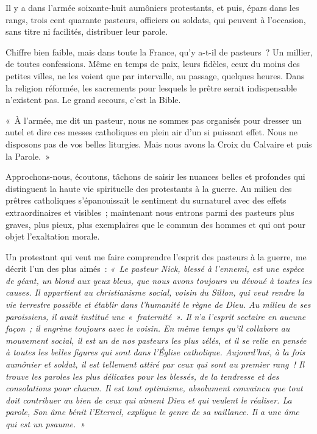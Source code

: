 \documentclass[french,twoside]{book} %
\newcommand\chaptercont{} %
\begin{document}
\chaptercont
\noindent Il y a dans l’armée soixante-huit aumôniers protestants, et puis, épars dans les rangs, trois cent quarante pasteurs, officiers ou soldats, qui peuvent à l’occasion, sans titre ni facilités, distribuer leur parole.‌\par
Chiffre bien faible, mais dans toute la France, qu’y a-t-il de pasteurs ? Un millier, de toutes confessions. Même en temps de paix, leurs fidèles, ceux du moins des petites villes, ne les voient que par intervalle, au passage, quelques heures. Dans la religion réformée, les sacrements pour lesquels le prêtre serait indispensable n’existent pas. Le grand secours, c’est la Bible.‌\par
« À l’armée, me dit un pasteur, nous ne sommes pas organisés pour dresser un autel et dire ces messes catholiques en plein air d’un si puissant effet. Nous ne disposons pas de vos belles liturgies. Mais nous avons la Croix du Calvaire et puis la Parole. »‌\par
Approchons-nous, écoutons, tâchons de saisir les nuances belles et profondes qui distinguent la haute vie spirituelle des protestants à la guerre. Au milieu des prêtres catholiques s’épanouissait le sentiment du surnaturel avec des effets extraordinaires et visibles ; maintenant nous entrons parmi des pasteurs plus graves, plus pieux, plus exemplaires que le commun des hommes et qui ont pour objet l’exaltation morale.‌\par
Un protestant qui veut me faire comprendre l’esprit des pasteurs à la guerre, me décrit l’un des plus aimés : \emph{« Le pasteur Nick, blessé à l’ennemi, est une espèce de géant, un blond aux yeux bleus, que nous avons toujours vu dévoué à toutes les causes. Il appartient au christianisme social, voisin du {\itshape Sillon}, qui veut rendre la vie terrestre possible et établir dans l’humanité le règne de Dieu. Au milieu de ses paroissiens, il avait institué une « fraternité ». Il n’a l’esprit sectaire en aucune façon ; il engrène toujours avec le voisin. En même temps qu’il collabore au mouvement social, il est un de nos pasteurs les plus zélés, et il se relie en pensée à toutes les belles figures qui sont dans l’Église catholique. Aujourd’hui, à la fois aumônier et soldat, il est tellement attiré par ceux qui sont au premier rang ! Il trouve les paroles les plus délicates pour les blessés, de la tendresse et des consolations pour chacun. Il est tout optimisme, absolument convaincu que tout doit contribuer au bien de ceux qui aiment Dieu et qui veulent le réaliser. La parole, {\itshape Son âme bénit l’Eternel}, explique le genre de sa vaillance. Il a une âme qui est un psaume. »‌}\par
\end{document}
